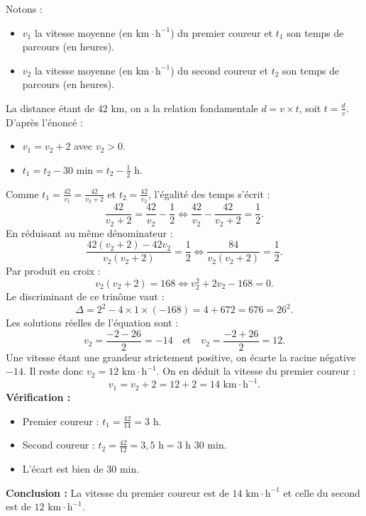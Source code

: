 \documentclass[11pt,a4paper]{article}
\begin{document}
\begin{correctionbox}
Notons :
\begin{itemize}
    \item $v_1$ la vitesse moyenne (en $\text{km}\cdot\text{h}^{-1}$) du premier coureur et $t_1$ son temps de parcours (en heures).
    \item $v_2$ la vitesse moyenne (en $\text{km}\cdot\text{h}^{-1}$) du second coureur et $t_2$ son temps de parcours (en heures).
\end{itemize}
La distance étant de $42\text{~km}$, on a la relation fondamentale $d = v \times t$, soit $t = \frac{d}{v}$.
D'après l'énoncé :
\begin{itemize}
    \item $v_1 = v_2 + 2$ avec $v_2 > 0$.
    \item $t_1 = t_2 - 30\text{~min} = t_2 - \frac{1}{2}\text{~h}$.
\end{itemize}
Comme $t_1 = \frac{42}{v_1} = \frac{42}{v_2 + 2}$ et $t_2 = \frac{42}{v_2}$, l'égalité des temps s'écrit :
\[
\frac{42}{v_2 + 2} = \frac{42}{v_2} - \frac{1}{2} \iff \frac{42}{v_2} - \frac{42}{v_2 + 2} = \frac{1}{2}.
\]
En réduisant au même dénominateur :
\[
\frac{42(v_2 + 2) - 42 v_2}{v_2(v_2 + 2)} = \frac{1}{2} \iff \frac{84}{v_2(v_2 + 2)} = \frac{1}{2}.
\]
Par produit en croix :
\[
v_2(v_2 + 2) = 168 \iff v_2^2 + 2v_2 - 168 = 0.
\]
Le discriminant de ce trinôme vaut :
\[
\Delta = 2^2 - 4 \times 1 \times (-168) = 4 + 672 = 676 = 26^2.
\]
Les solutions réelles de l'équation sont :
\[
v_2 = \frac{-2 - 26}{2} = -14 \quad \text{et} \quad v_2 = \frac{-2 + 26}{2} = 12.
\]
Une vitesse étant une grandeur strictement positive, on écarte la racine négative $-14$. Il reste donc $v_2 = 12\text{~km}\cdot\text{h}^{-1}$.
On en déduit la vitesse du premier coureur :
\[
v_1 = v_2 + 2 = 12 + 2 = 14\text{~km}\cdot\text{h}^{-1}.
\]
\textbf{Vérification :}
\begin{itemize}
    \item Premier coureur : $t_1 = \frac{42}{14} = 3\text{~h}$.
    \item Second coureur : $t_2 = \frac{42}{12} = 3{,}5\text{~h} = 3\text{~h } 30\text{~min}$.
    \item L'écart est bien de $30\text{~min}$.
\end{itemize}
\textbf{Conclusion :} La vitesse du premier coureur est de \textbf{$14\text{~km}\cdot\text{h}^{-1}$} et celle du second est de \textbf{$12\text{~km}\cdot\text{h}^{-1}$}.
\end{correctionbox}
\end{document}
